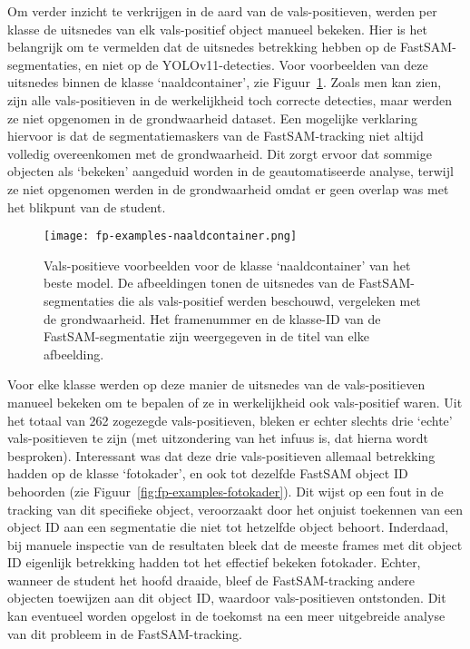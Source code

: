 Om verder inzicht te verkrijgen in de aard van de vals-positieven, werden per klasse de uitsnedes van elk vals-positief object manueel bekeken.
Hier is het belangrijk om te vermelden dat de uitsnedes betrekking hebben op de FastSAM-segmenta\-ties,
en niet op de YOLOv11-detecties.
Voor voorbeelden van deze uitsnedes binnen de klasse `naaldcontainer', zie Figuur~\ref{fig:fp-examples-naaldcontainer}.
Zoals men kan zien, zijn alle vals-positieven in de werkelijkheid toch correcte detecties, maar werden ze niet opgenomen in de grondwaarheid dataset.
Een mogelijke verklaring hiervoor is dat de segmentatiemaskers van de FastSAM-tracking niet altijd volledig 
overeenkomen met de grondwaarheid.
Dit zorgt ervoor dat sommige objecten als `bekeken' aangeduid worden in de geautomatiseerde analyse, 
terwijl ze niet opgenomen werden in de grondwaarheid omdat er geen overlap was met het blikpunt van de student.
\begin{figure}[H]
    \centering
    \texttt{[image: fp-examples-naaldcontainer.png]}
    \caption[]{\label{fig:fp-examples-naaldcontainer}
    Vals-positieve voorbeelden voor de klasse `naaldcontainer' van het beste model.
    De afbeeldingen tonen de uitsnedes van de FastSAM-segmentaties die als vals-positief werden beschouwd, vergeleken met de grondwaarheid.
    Het framenummer en de klasse-ID van de FastSAM-segmentatie zijn weergegeven in de titel van elke afbeelding.
    }
\end{figure}

Voor elke klasse werden op deze manier de uitsnedes van de vals-positieven manueel bekeken om te bepalen of ze in werkelijkheid ook vals-positief waren.
Uit het totaal van 262 zogezegde vals-positieven, bleken er echter slechts drie `echte' vals-positieven te zijn (met uitzondering van het infuus is, dat hierna wordt besproken).
Interessant was dat deze drie vals-positieven allemaal betrekking hadden op de klasse `fotokader', en ook tot dezelfde FastSAM object ID behoorden (zie Figuur~\ref{fig:fp-examples-fotokader}).
Dit wijst op een fout in de tracking van dit specifieke object, veroorzaakt door het onjuist toekennen van een object ID aan een segmentatie die niet tot hetzelfde object behoort.
Inderdaad, bij manuele inspectie van de resultaten bleek dat de meeste frames met dit object ID eigenlijk betrekking hadden tot het effectief bekeken fotokader.
Echter, wanneer de student het hoofd draaide, bleef de FastSAM-tracking andere objecten toewijzen aan dit object ID, waardoor vals-positieven ontstonden.
Dit kan eventueel worden opgelost in de toekomst na een meer uitgebreide analyse van dit probleem in de FastSAM-tracking.

